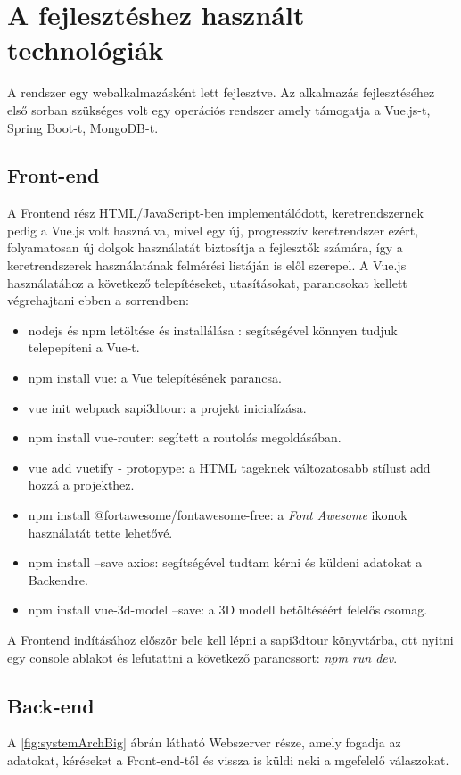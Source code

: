\section{A fejlesztéshez használt technológiák}
A rendszer egy webalkalmazásként lett fejlesztve. Az alkalmazás fejlesztéséhez első sorban szükséges volt egy operációs rendszer amely támogatja a Vue.js-t, Spring Boot-t, MongoDB-t.

\subsection{Front-end}
A Frontend rész HTML/JavaScript-ben implementálódott, keretrendszernek pedig a Vue.js volt használva, mivel egy új, progresszív keretrendszer ezért, folyamatosan új dolgok használatát biztosítja a fejlesztők számára, így a keretrendszerek használatának felmérési listáján is elől szerepel. A Vue.js használatához a következő telepítéseket, utasításokat, parancsokat kellett végrehajtani ebben a sorrendben:
\begin{itemize}
	\item nodejs és npm letöltése és installálása : segítségével könnyen tudjuk telepepíteni a Vue-t.
	\item npm install vue: a Vue telepítésének parancsa.
	\item vue init webpack sapi3dtour: a projekt inicialízása.
	\item npm install vue-router: segített a routolás megoldásában.
	\item vue add vuetify -  protopype: a HTML tageknek változatosabb stílust add hozzá a projekthez.
	\item npm install @fortawesome/fontawesome-free: a {\textit{Font Awesome}\footnotemark} ikonok használatát tette lehetővé.
	\item npm install --save axios: segítségével tudtam kérni és küldeni adatokat a Backendre.
	\item npm install vue-3d-model --save: a 3D modell betöltéséért felelős csomag. 
\end{itemize}

A Frontend indításához először bele kell lépni a sapi3dtour könyvtárba, ott nyitni egy console ablakot és lefutattni a következő parancssort: {\textit{npm run dev}}.

\subsection{Back-end}
A \ref{fig:systemArchBig} ábrán látható Webszerver része, amely fogadja az adatokat, kéréseket a Front-end-től és vissza is küldi neki a mgefelelő válaszokat.

